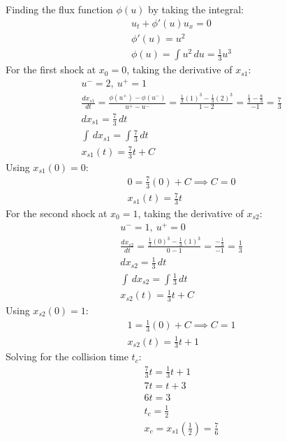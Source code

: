 \documentclass[letterpaper,11pt]{article}
\begin{document}
    Finding the flux function $\phi(u)$ by taking the integral:
    \begin{gather*}
        u_t + \phi'(u) u_x = 0 \\
        \phi'(u) = u^2 \\
        \phi(u) = \int u^2 \,du = \frac{1}{3}u^3
    \end{gather*}
    For the first shock at $x_0 = 0$, taking the derivative of $x_{s1}$:
    \begin{gather*}
        u^- = 2,\ u^+ = 1 \\
        \frac{dx_{s1}}{dt} = \frac{\phi(u^+) - \phi(u^-)}{u^+ - u^-} = \frac{\frac{1}{3}(1)^3 - \frac{1}{3}(2)^3}{1 - 2} = \frac{\frac{1}{3} - \frac{8}{3}}{-1} = \frac{7}{3} \\
        dx_{s1} = \frac{7}{3} \,dt \\
        \int \,dx_{s1} = \int \frac{7}{3} \,dt \\
        x_{s1}(t) = \frac{7}{3}t + C
    \end{gather*}
    Using $x_{s1}(0) = 0$:
    \begin{gather*}
        0 = \frac{7}{3}(0) + C \implies C = 0 \\
        x_{s1}(t) = \frac{7}{3}t
    \end{gather*}
    For the second shock at $x_0 = 1$, taking the derivative of $x_{s2}$:
    \begin{gather*}
        u^- = 1,\ u^+ = 0 \\
        \frac{dx_{s2}}{dt} = \frac{\frac{1}{3}(0)^3 - \frac{1}{3}(1)^3}{0 - 1} = \frac{-\frac{1}{3}}{-1} = \frac{1}{3} \\
        dx_{s2} = \frac{1}{3} \,dt \\
        \int \,dx_{s2} = \int \frac{1}{3} \,dt \\
        x_{s2}(t) = \frac{1}{3}t + C
    \end{gather*}
    Using $x_{s2}(0) = 1$:
    \begin{gather*}
        1 = \frac{1}{3}(0) + C \implies C = 1 \\
        x_{s2}(t) = \frac{1}{3}t + 1
    \end{gather*}
    Solving for the collision time $t_c$:
    \begin{gather*}
        \frac{7}{3}t = \frac{1}{3}t + 1 \\
        7t = t + 3 \\
        6t = 3 \\
        t_c = \frac{1}{2} \\
        x_c = x_{s1}\left(\frac{1}{2}\right) = \frac{7}{6}
    \end{gather*}
\end{document}
